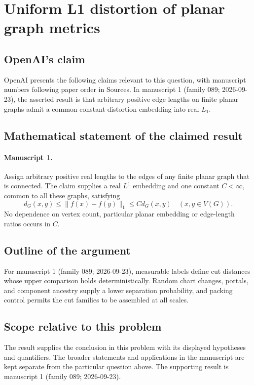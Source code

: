 \documentclass[11pt]{article}
\begin{document}
\section*{Uniform L1 distortion of planar graph metrics}

\subsection{OpenAI's claim}
OpenAI presents the following claims relevant to this question, with manuscript numbers following paper order in Sources. In manuscript 1 (family 089; 2026-09-23), the asserted result is that arbitrary positive edge lengths on finite planar graphs admit a common constant-distortion embedding into real $L_1$.

\subsection{Mathematical statement of the claimed result}
\paragraph{Manuscript 1.}
Assign arbitrary positive real lengths to the edges of any finite planar graph that is connected. The claim supplies a real $L^1$ embedding and one constant $C<\infty$, common to all these graphs, satisfying
\[
 d_G(x,y)\le\|f(x)-f(y)\|_1\le C d_G(x,y)\quad(x,y\in V(G)).
\]
No dependence on vertex count, particular planar embedding or edge-length ratios occurs in $C$.

\subsection{Outline of the argument}
For manuscript 1 (family 089; 2026-09-23), measurable labels define cut distances whose upper comparison holds deterministically. Random chart changes, portals, and component ancestry supply a lower separation probability, and packing control permits the cut families to be assembled at all scales.

\subsection{Scope relative to this problem}
The result supplies the conclusion in this problem with its displayed hypotheses and quantifiers. The broader statements and applications in the manuscript are kept separate from the particular question above. The supporting result is manuscript 1 (family 089; 2026-09-23).
\end{document}
